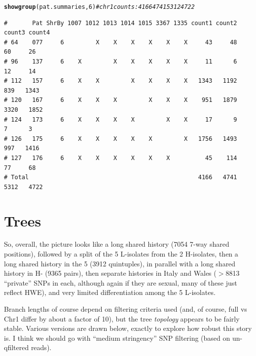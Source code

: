 \documentclass{article}\usepackage[]{graphicx}\usepackage[]{color}
\makeatletter
\newcommand{\hlnum}[1]{\textcolor[rgb]{0.686,0.059,0.569}{#1}}%
\newcommand{\hlcom}[1]{\textcolor[rgb]{0.678,0.584,0.686}{\textit{#1}}}%
\newcommand{\hlstd}[1]{\textcolor[rgb]{0.345,0.345,0.345}{#1}}%
\newcommand{\hlkwd}[1]{\textcolor[rgb]{0.737,0.353,0.396}{\textbf{#1}}}%
\newenvironment{kframe}{%
 \def\at@end@of@kframe{}%
 \ifinner\ifhmode%
  \def\at@end@of@kframe{\end{minipage}}%
  \begin{minipage}{\columnwidth}%
 \fi\fi%
 \def\FrameCommand##1{\hskip\@totalleftmargin \hskip-\fboxsep
 \colorbox{shadecolor}{##1}\hskip-\fboxsep
     \hskip-\linewidth \hskip-\@totalleftmargin \hskip\columnwidth}%
 \MakeFramed {\advance\hsize-\width
   \@totalleftmargin\z@ \linewidth\hsize
   \@setminipage}}%
 {\par\unskip\endMakeFramed%
 \at@end@of@kframe}
\newenvironment{knitrout}{}{} %
\makeatother
\begin{document}
\begin{knitrout}\footnotesize
{}\color{fgcolor}\begin{kframe}
\begin{alltt}
\hlkwd{showgroup}\hlstd{(pat.summaries,}\hlnum{6}\hlstd{)} \hlcom{# chr 1 counts:  4166   4741   5312  4722}
\end{alltt}
\begin{verbatim}
#       Pat ShrBy 1007 1012 1013 1014 1015 3367 1335 count1 count2 count3 count4
# 64    077     6         X    X    X    X    X    X     43     48     60     26
# 96    137     6    X         X    X    X    X    X     11      6     12     14
# 112   157     6    X    X         X    X    X    X   1343   1192    839   1343
# 120   167     6    X    X    X         X    X    X    951   1879   3320   1852
# 124   173     6    X    X    X    X         X    X     17      9      7      3
# 126   175     6    X    X    X    X    X         X   1756   1493    997   1416
# 127   176     6    X    X    X    X    X    X          45    114     77     68
# Total                                                4166   4741   5312   4722
\end{verbatim}
\end{kframe}
\end{knitrout}

\section{Trees}
So, overall, the picture looks like a long shared history
  (7054 7-way shared positions),
followed by a split of the 5 L-isolates from the 2 H-isolates, then a long shared history in the 5
  (3912 quintuples),
in parallel with a long shared history in H-
  (9365 pairs),
then separate histories in Italy and Wales
  ($>$8813 
  ``private'' SNPs in each, although again if they are sexual, many of these just reflect HWE),
and very limited differentiation among the 5 L-isolates.  

Branch lengths of course depend on filtering criteria used (and, of course, full vs Chr1 differ by 
about a factor of 10), but the tree \emph{topology} appears to be fairly stable.  Various versions 
are drawn below, exactly to explore how robust this story is.  I think we should go with ``medium 
stringency'' SNP filtering (based on un-qfiltered reads).
\end{document}
